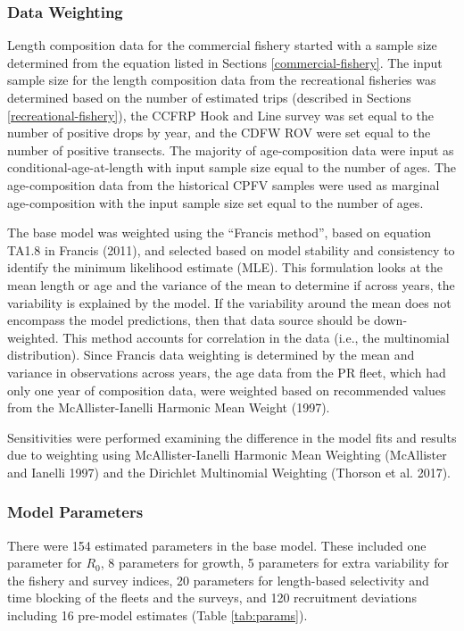 \documentclass[11pt,
  english,
  letterpaper,
]{article}
\begin{document}
\hypertarget{data-weighting}{%
\subsubsection{Data Weighting}\label{data-weighting}}

Length composition data for the commercial fishery started with a sample size determined from the equation listed in Sections \ref{commercial-fishery}. The input sample size for the length composition data from the recreational fisheries was determined based on the number of estimated trips (described in Sections \ref{recreational-fishery}), the CCFRP Hook and Line survey was set equal to the number of positive drops by year, and the CDFW ROV were set equal to the number of positive transects. The majority of age-composition data were input as conditional-age-at-length with input sample size equal to the number of ages. The age-composition data from the historical CPFV samples were used as marginal age-composition with the input sample size set equal to the number of ages.

The base model was weighted using the ``Francis method'', based on equation TA1.8 in Francis (2011), and selected based on model stability and consistency to identify the minimum likelihood estimate (MLE). This formulation looks at the mean length or age and the variance of the mean to determine if across years, the variability is explained by the model. If the variability around the mean does not encompass the model predictions, then that data source should be down-weighted. This method accounts for correlation in the data (i.e., the multinomial distribution). Since Francis data weighting is determined by the mean and variance in observations across years, the age data from the PR fleet, which had only one year of composition data, were weighted based on recommended values from the McAllister-Ianelli Harmonic Mean Weight (1997).

Sensitivities were performed examining the difference in the model fits and results due to weighting using McAllister-Ianelli Harmonic Mean Weighting (McAllister and Ianelli 1997) and the Dirichlet Multinomial Weighting (Thorson et al. 2017).

\hypertarget{model-parameters}{%
\subsubsection{Model Parameters}\label{model-parameters}}

There were 154 estimated parameters in the base model. These included one parameter for \(R_0\), 8 parameters for growth, 5 parameters for extra variability for the fishery and survey indices, 20 parameters for length-based selectivity and time blocking of the fleets and the surveys, and 120 recruitment deviations including 16 pre-model estimates (Table \ref{tab:params}).
\end{document}
